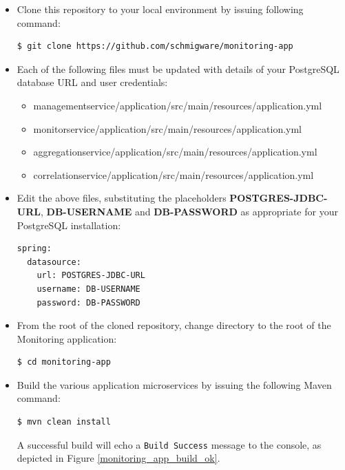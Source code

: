 \begin{itemize}
	\item Clone this repository to your local environment by issuing following command: 
\begin{lstlisting}[language=bash]
$ git clone https://github.com/schmigware/monitoring-app
\end{lstlisting}

	\item Each of the following files must be updated with details of your PostgreSQL database URL and user credentials:
	\begin{itemize}
		\item managementservice/application/src/main/resources/application.yml
		\item monitorservice/application/src/main/resources/application.yml
		\item aggregationservice/application/src/main/resources/application.yml
		\item correlationservice/application/src/main/resources/application.yml
	\end{itemize}	

\item Edit the above files, substituting the placeholders  \textbf{POSTGRES-JDBC-URL}, \textbf{DB-USERNAME} and \textbf{DB-PASSWORD} as appropriate for your PostgreSQL installation:

\begin{lstlisting}[language=bash]
spring:
  datasource:
    url: POSTGRES-JDBC-URL
    username: DB-USERNAME
    password: DB-PASSWORD
\end{lstlisting}	

	\item From the root of the cloned repository, change directory to the root of the Monitoring application:
\begin{lstlisting}[language=bash]
$ cd monitoring-app 
\end{lstlisting}	
	\item Build the various application microservices by issuing the following Maven command:
\begin{lstlisting}[language=bash]
$ mvn clean install
\end{lstlisting}	

A successful build will echo a \texttt{Build Success} message to the console, as depicted in Figure \ref{monitoring_app_build_ok}.


\end{itemize}
